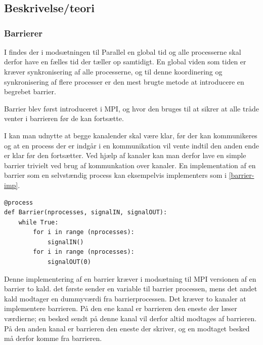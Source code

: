 \chapter{\des}
  \section{Beskrivelse/teori}\label{sec:des-theory}
   
\subsection{Barrierer}\label{barrier}
I \des findes der i modsætningen til 
Parallel \des {} en global tid og alle processerne skal derfor have en 
fælles tid der tæller op samtidigt. 
En global viden som tiden er kræver synkronisering af alle processerne, og  til denne koordinering og synkronisering af flere processer er den mest brugte metode at introducere en begrebet barrier.

Barrier blev først introduceret i MPI, og hvor den bruges til at sikrer at alle tråde venter i barrieren 
før de kan fortsætte. 

I \pycsp kan man udnytte at begge kanalender skal være klar, før der kan kommunikeres og at en process der er indgår i en kommunikation vil vente indtil den anden ende er klar før den fortsætter. Ved hjælp af kanaler kan man derfor lave en simple barrier trivielt ved brug af kommunkation over kanaler. En implementation af en barrier som en selvstændig process kan eksempelvis implementers som i \cref{barrier-imp}.

\begin{lstlisting}[float, label=barrier-imp,caption=En barrier i \pycsp]
@process
def Barrier(nprocesses, signalIN, signalOUT):
	while True:
		for i in range (nprocesses):
			signalIN()
		for i in range (nprocesses):
			signalOUT(0)
\end{lstlisting}

Denne implementering af en barrier kræver i modsætning til MPI versionen af en barrier to kald. det første sender en variable til barrier processen, mens det andet kald modtager en dummyværdi fra barrierprocessen. Det kræver to kanaler at implementere barrieren. På den ene kanal er barrieren den eneste der læser værdierne; en besked sendt på denne kanal vil derfor altid modtages af barrieren. På den anden kanal er barrieren den eneste der skriver, og en modtaget besked må derfor komme fra barrieren.

